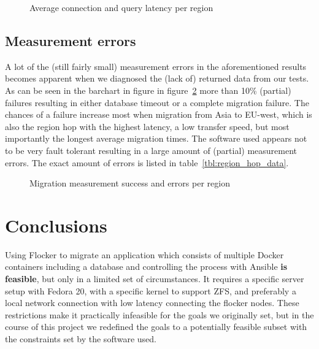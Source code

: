 \documentclass{article}
\begin{document}
\begin{center}
\begin{figure}[!ht]
    \caption{Average connection and query latency per region}
    \label{fig:latency_region}
\end{figure}
\end{center}


\subsection{Measurement errors}

A lot of the (still fairly small) measurement errors in the aforementioned results becomes apparent when we diagnosed the (lack of) returned data from our tests. As can be seen in the barchart in figure in figure~\ref{fig:errors_region} more than 10\% (partial) failures resulting in either database timeout or a complete migration failure. The chances of a failure increase most when migration from Asia to EU-west, which is also the region hop with the highest latency, a low transfer speed, but most importantly the longest average migration times. The software used appears not to be very fault tolerant resulting in a large amount of (partial) measurement errors. The exact amount of errors is listed in table~\ref{tbl:region_hop_data}.

\begin{center}
\begin{figure}[!ht]
    \caption{Migration measurement success and errors per region}
    \label{fig:errors_region}
\end{figure}
\end{center}




\clearpage
\section{Conclusions}

Using Flocker to migrate an application which consists of multiple Docker containers including a database and controlling the process with Ansible \textbf{is feasible}, but only in a limited set of circumstances. It requires a specific server setup with Fedora 20, with a specific kernel to support ZFS, and preferably a local network connection with low latency connecting the flocker nodes. These restrictions make it practically infeasible for the goals we originally set, but in the course of this project we redefined the goals to a potentially feasible subset with the constraints set by the software used. \\ \\
\end{document}
